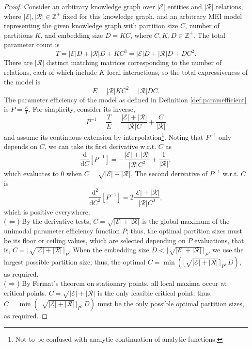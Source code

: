 \documentclass{ecai}
\def\gE{{\mathcal{E}}}
\def\gR{{\mathcal{R}}}
\def\sZ{{\mathbb{Z}}}
\theoremstyle{plain}  \newtheorem{thm}{Theorem}  \newtheorem{lem}[thm]{Lemma}  \newtheorem{prop}[thm]{Proposition}
\theoremstyle{remark}  \newtheorem*{rem}{Remark}
\newcommand{\round}[1]{{\lfloor{#1}\rceil}}
\begin{document}
\begin{proof}
	Consider an arbitrary knowledge graph over $ |\gE| $ entities and $ |\gR| $ relations, where $ |\gE|, |\gR| \in \sZ^+ $ fixed for this knowledge graph, and an arbitrary MEI model representing the given knowledge graph with partition size $ C $, number of partitions $ K $, and embedding size $ D = KC $, where $ C, K, D \in \sZ^+ $. The total parameter count is $$ \textstyle T = |\gE| D + |\gR| D + K C^3 = |\gE| D + |\gR| D + D C^2. $$ There are $ |\gR| $ distinct matching matrices corresponding to the number of relations, each of which include $ K $ local interactions, so the total expressiveness of the model is $$ \textstyle E = |\gR| K C^2 = |\gR| D C. $$ The parameter efficiency of the model as defined in Definition \ref{def:paramefficient} is $ P = \frac{E}{T} $. For simplicity, consider its inverse, $$ \textstyle P^{-1} = \frac{T}{E} = \frac{|\gE| + |\gR|}{|\gR|C} + \frac{C}{|\gR|} $$ and assume its continuous extension by interpolation\footnote{Not to be confused with analytic continuation of analytic functions.}. Noting that $ P^{-1} $ only depends on $ C $, we can take its first derivative w.r.t. $ C $ as $$ \textstyle \frac{\mathrm{d}}{\mathrm{d} C}[P^{-1}] = - \frac{|\gE| + |\gR|}{|\gR|C^2} + \frac{1}{|\gR|}, $$ which evaluates to $ 0 $ when $ C = \sqrt{|\gE| + |\gR|} $. The second derivative of $ P^{-1} $ w.r.t. $ C $ is $$ \textstyle \frac{\mathrm{d}^2}{\mathrm{d} C^2}[P^{-1}] = 2 \frac{|\gE| + |\gR|}{|\gR|C^3}, $$ which is positive everywhere.\\
	($ \Leftarrow $) By the derivative tests, $ C = \sqrt{|\gE| + |\gR|} $ is the global maximum of the unimodal parameter efficiency function $ P $; thus, the optimal partition sizes must be its floor or ceiling values, which are selected depending on $ P $ evaluations, that is, $ C = \round{\sqrt{|\gE| + |\gR|}}_{P} $. When the embedding size $ D < \round{\sqrt{|\gE| + |\gR|}}_{P} $, we use the largest possible partition size; thus, the optimal $ C = \min(\round{\sqrt{|\gE| + |\gR|}}_{P}, D) $, as required.\\
	($ \Rightarrow $) By Fermat's theorem on stationary points, all local maxima occur at critical points. $ C = \sqrt{|\gE| + |\gR|} $ is the only feasible critical point; thus, $ C = \min(\round{\sqrt{|\gE| + |\gR|}}_{P}, D) $ must be the only possible optimal partition sizes, as required.
\end{proof}
\end{document}

